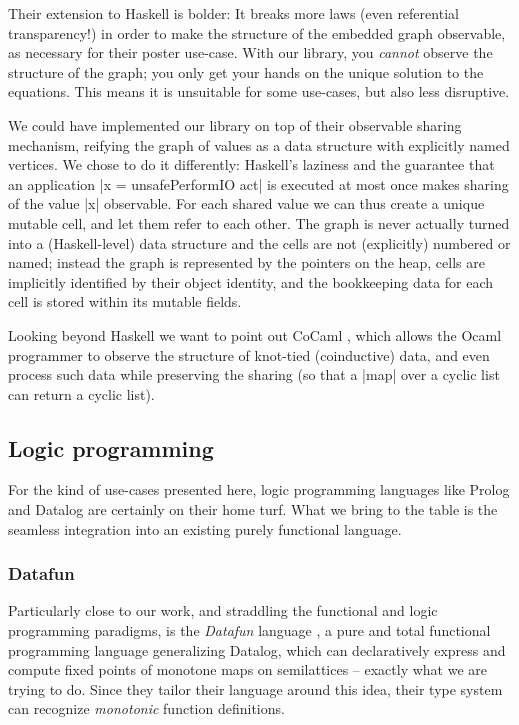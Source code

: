 \documentclass[manuscript,review,screen,acmsmall]{acmart}
\begin{document}
Their extension to Haskell is bolder: It breaks more laws (even referential transparency!) in order to make the structure of the embedded graph observable, as necessary for their poster use-case. With our library, you \emph{cannot} observe the structure of the graph; you only get your hands on the unique solution to the equations. This means it is unsuitable for some use-cases, but also less disruptive.

We could have implemented our library on top of their observable sharing mechanism, reifying the graph of values as a data structure with explicitly named vertices. We chose to do it differently: Haskell's laziness and the guarantee that an application |x = unsafePerformIO act| is executed at most once makes sharing of the value |x| observable. For each shared value we can thus create a unique mutable cell, and let them refer to each other.
The graph is never actually turned into a (Haskell-level) data structure and the cells are not (explicitly) numbered or named; instead the graph is represented by the pointers on the heap, cells are implicitly identified by their object identity, and the bookkeeping data for each cell is stored within its mutable fields.

Looking beyond Haskell we want to point out CoCaml \citep{cocaml}, which allows the Ocaml programmer to observe the structure of knot-tied (coinductive) data, and even process such data while preserving the sharing (so that a |map| over a cyclic list can return a cyclic list).


\subsection{Logic programming}

For the kind of use-cases presented here, logic programming languages like Prolog and Datalog are certainly on their home turf. What we bring to the table is the seamless integration into an existing purely functional language.

\subsubsection{Datafun}

Particularly close to our work, and straddling the functional and logic programming paradigms, is the \emph{Datafun} language \citep{datafun}, a pure and total functional programming language generalizing Datalog, which can declaratively express and compute fixed points of monotone maps on semilattices -- exactly what we are trying to do. Since they tailor their language around this idea, their type system can recognize \emph{monotonic} function definitions.
\end{document}
